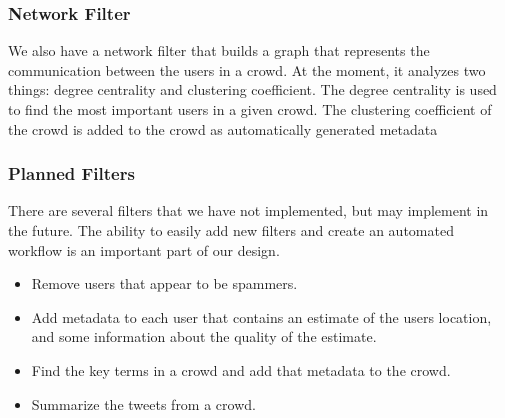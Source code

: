 \documentclass{sig-alternate}
\begin{document}
\subsubsection{Network Filter}
We also have a network filter that builds a graph that represents the
communication between the users in a crowd. At the moment, it analyzes two things:
degree centrality and clustering coefficient.  The degree centrality is used to
find the most important users in a given crowd. The clustering coefficient of
the crowd is added to the crowd as automatically generated metadata 

\subsubsection{Planned Filters}
There are several filters that we have not implemented, but may implement in
the future. The ability to easily add new filters and create an automated
workflow is an important part of our design.
\begin{itemize}
\item Remove users that appear to be spammers.
\item Add metadata to each user that contains an estimate of the users
    location, and some information about the quality of the estimate.
\item Find the key terms in a crowd and add that metadata to the crowd.
\item Summarize the tweets from a crowd.
\end{itemize}
\end{document}
